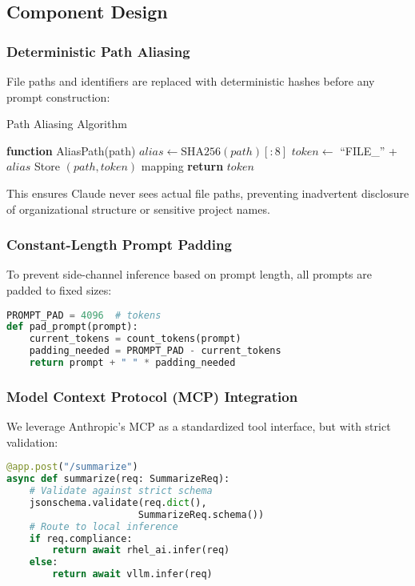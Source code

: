 \documentclass[11pt]{article}
\begin{document}
\subsection{Component Design}

\subsubsection{Deterministic Path Aliasing}

File paths and identifiers are replaced with deterministic hashes before any prompt construction:

\begin{algorithm}
\caption{Path Aliasing Algorithm}
\begin{algorithmic}[1]
\STATE \textbf{function} AliasPath(path)
\STATE $alias \gets \text{SHA256}(path)[:8]$
\STATE $token \gets$ ``FILE\_'' + $alias$
\STATE Store $(path, token)$ mapping
\STATE \textbf{return} $token$
\end{algorithmic}
\end{algorithm}

This ensures Claude never sees actual file paths, preventing inadvertent disclosure of organizational structure or sensitive project names.

\subsubsection{Constant-Length Prompt Padding}

To prevent side-channel inference based on prompt length, all prompts are padded to fixed sizes:

\begin{lstlisting}[language=python, caption={Prompt padding implementation}]
PROMPT_PAD = 4096  # tokens
def pad_prompt(prompt):
    current_tokens = count_tokens(prompt)
    padding_needed = PROMPT_PAD - current_tokens
    return prompt + " " * padding_needed
\end{lstlisting}

\subsubsection{Model Context Protocol (MCP) Integration}

We leverage Anthropic's MCP \cite{anthropic2024mcp} as a standardized tool interface, but with strict validation:

\begin{lstlisting}[language=python, caption={MCP server with schema validation}]
@app.post("/summarize")
async def summarize(req: SummarizeReq):
    # Validate against strict schema
    jsonschema.validate(req.dict(), 
                       SummarizeReq.schema())
    # Route to local inference
    if req.compliance:
        return await rhel_ai.infer(req)
    else:
        return await vllm.infer(req)
\end{lstlisting}
\end{document}

